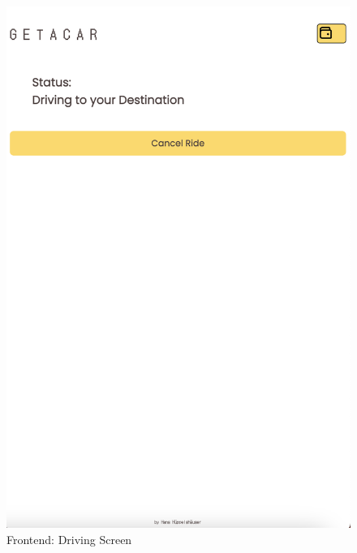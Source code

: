 \begin{figure}[h]
    \centering
    
    \begin{minipage}{0.45\linewidth}
        \centering
        \includegraphics[width=\linewidth]{data/ffss/9.png}
        \caption{Frontend: Driving Screen}
        \label{fig:DrivingScreen}
    \end{minipage}
    \hfill
    \begin{minipage}{0.45\linewidth}
        \centering

\end{minipage}
\end{figure}
